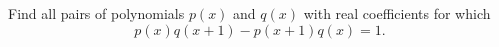 Find all pairs of polynomials $p(x)$ and $q(x)$ with real coefficients for which
\[p(x)q(x+1)-p(x+1)q(x)=1.\]